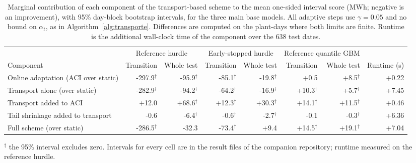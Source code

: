 \begin{table}[tp]
\centering
\footnotesize
\caption{Marginal contribution of each component of the transport-based scheme to the mean one-sided interval score (MWh; negative is an improvement), with 95\% day-block bootstrap intervals, for the three main base models. All adaptive steps use $\gamma=0.05$ and no bound on $\alpha_t$, as in Algorithm~\ref{alg:transporte}. Differences are computed on the plant-days where both limits are finite. Runtime is the additional wall-clock time of the component over the 638 test dates.}
\label{tab:ablaciones}
\begin{tabular}{l rr rr rr r}
\toprule
 & \multicolumn{2}{c}{Reference hurdle} & \multicolumn{2}{c}{Early-stopped hurdle} & \multicolumn{2}{c}{Reference quantile GBM} & \\
\cmidrule(lr){2-3}\cmidrule(lr){4-5}\cmidrule(lr){6-7}
Component & Transition & Whole test & Transition & Whole test & Transition & Whole test & Runtime (s) \\
\midrule
Online adaptation (ACI over static) & -297.9$^\dagger$ & -95.9$^\dagger$ & -85.1$^\dagger$ & -19.8$^\dagger$ & +0.5 & +8.5$^\dagger$ & +0.22 \\
Transport alone (over static) & -282.9$^\dagger$ & -94.2$^\dagger$ & -64.2$^\dagger$ & -16.9$^\dagger$ & +10.3$^\dagger$ & +5.7$^\dagger$ & +7.45 \\
Transport added to ACI & +12.0 & +68.6$^\dagger$ & +12.3$^\dagger$ & +30.3$^\dagger$ & +14.1$^\dagger$ & +11.5$^\dagger$ & +0.46 \\
Tail shrinkage added to transport & -0.6 & -6.4$^\dagger$ & -0.6$^\dagger$ & -2.7$^\dagger$ & -0.1 & -0.3$^\dagger$ & +6.36 \\
Full scheme (over static) & -286.5$^\dagger$ & -32.3 & -73.4$^\dagger$ & +9.4 & +14.5$^\dagger$ & +19.1$^\dagger$ & +7.04 \\
\bottomrule
\end{tabular}

\smallskip\parbox{0.95\linewidth}{\scriptsize $^\dagger$ the 95\% interval excludes zero. Intervals for every cell are in the result files of the companion repository; runtime measured on the reference hurdle.}
\end{table}
